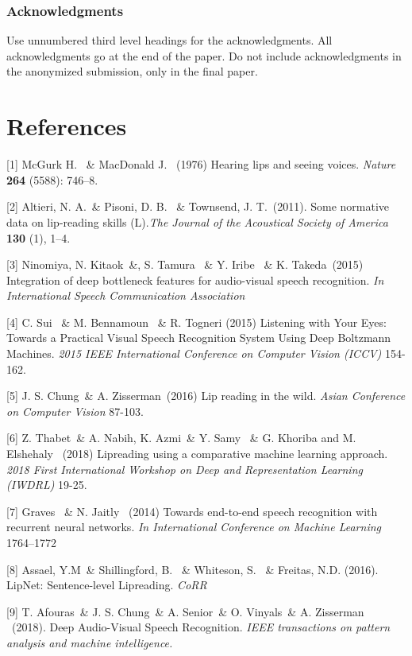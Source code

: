 \documentclass{article}
\begin{document}
\subsubsection*{Acknowledgments}

Use unnumbered third level headings for the acknowledgments. All acknowledgments
go at the end of the paper. Do not include acknowledgments in the anonymized
submission, only in the final paper.

\section*{References}
\small

[1] McGurk H. \ \& MacDonald J. \ (1976) Hearing lips and seeing voices. {\it Nature} {\bf 264} (5588): 746–8.

[2] Altieri, N. A.\ \& Pisoni, D. B. \ \& Townsend, J. T.\  (2011). Some normative data on lip-reading skills (L).{\it The Journal of the Acoustical Society of America}  {\bf 130} (1), 1–4.

[3]  Ninomiya, N. Kitaok\ \&, S. Tamura \ \& Y. Iribe \ \&  K. Takeda\ (2015) Integration of deep bottleneck features for audio-visual speech recognition. {\it In International Speech Communication Association}

[4] C. Sui \ \& M. Bennamoun \ \& R. Togneri (2015) Listening with Your Eyes: Towards a Practical Visual Speech Recognition System Using Deep Boltzmann Machines. {\it 2015 IEEE International Conference on Computer Vision (ICCV)} 154-162.

[5] J. S. Chung\ \& A. Zisserman\ (2016) Lip reading in the wild. {\it Asian Conference on Computer Vision} 87-103.

[6] Z. Thabet\ \& A. Nabih, K. Azmi\ \& Y. Samy \ \& G. Khoriba and M. Elshehaly \ (2018) Lipreading using a comparative machine learning approach. {\it 2018 First International Workshop on Deep and Representation Learning (IWDRL)} 19-25.

[7]  Graves \ \& N. Jaitly \ (2014) Towards end-to-end speech recognition with recurrent neural networks. {\it In International Conference on Machine Learning} 1764–1772

[8] Assael, Y.M\ \& Shillingford, B. \ \& Whiteson, S. \ \& Freitas, N.D. (2016). LipNet: Sentence-level Lipreading. {\it CoRR}

[9] T. Afouras\ \& J. S. Chung\ \& A. Senior\ \& O. Vinyals\ \& A. Zisserman \ (2018). Deep Audio-Visual Speech Recognition. {\it IEEE transactions on pattern analysis and machine intelligence.}
\end{document}
